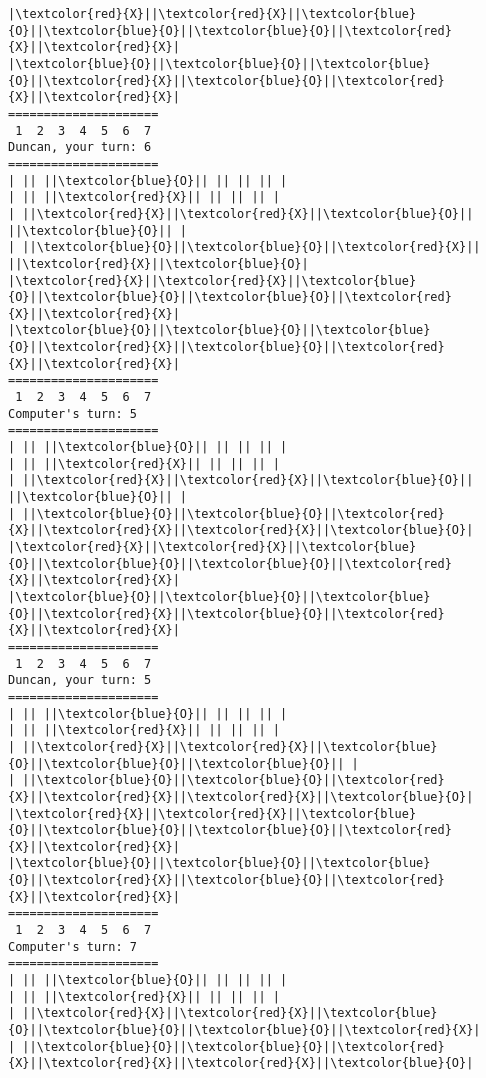 \documentclass{article}
\begin{document}
\begin{Verbatim}[commandchars=\\\{\}]
|\textcolor{red}{X}||\textcolor{red}{X}||\textcolor{blue}{O}||\textcolor{blue}{O}||\textcolor{blue}{O}||\textcolor{red}{X}||\textcolor{red}{X}|
|\textcolor{blue}{O}||\textcolor{blue}{O}||\textcolor{blue}{O}||\textcolor{red}{X}||\textcolor{blue}{O}||\textcolor{red}{X}||\textcolor{red}{X}|
=====================
 1  2  3  4  5  6  7
Duncan, your turn: 6
=====================
| || ||\textcolor{blue}{O}|| || || || |
| || ||\textcolor{red}{X}|| || || || |
| ||\textcolor{red}{X}||\textcolor{red}{X}||\textcolor{blue}{O}|| ||\textcolor{blue}{O}|| |
| ||\textcolor{blue}{O}||\textcolor{blue}{O}||\textcolor{red}{X}|| ||\textcolor{red}{X}||\textcolor{blue}{O}|
|\textcolor{red}{X}||\textcolor{red}{X}||\textcolor{blue}{O}||\textcolor{blue}{O}||\textcolor{blue}{O}||\textcolor{red}{X}||\textcolor{red}{X}|
|\textcolor{blue}{O}||\textcolor{blue}{O}||\textcolor{blue}{O}||\textcolor{red}{X}||\textcolor{blue}{O}||\textcolor{red}{X}||\textcolor{red}{X}|
=====================
 1  2  3  4  5  6  7
Computer's turn: 5
=====================
| || ||\textcolor{blue}{O}|| || || || |
| || ||\textcolor{red}{X}|| || || || |
| ||\textcolor{red}{X}||\textcolor{red}{X}||\textcolor{blue}{O}|| ||\textcolor{blue}{O}|| |
| ||\textcolor{blue}{O}||\textcolor{blue}{O}||\textcolor{red}{X}||\textcolor{red}{X}||\textcolor{red}{X}||\textcolor{blue}{O}|
|\textcolor{red}{X}||\textcolor{red}{X}||\textcolor{blue}{O}||\textcolor{blue}{O}||\textcolor{blue}{O}||\textcolor{red}{X}||\textcolor{red}{X}|
|\textcolor{blue}{O}||\textcolor{blue}{O}||\textcolor{blue}{O}||\textcolor{red}{X}||\textcolor{blue}{O}||\textcolor{red}{X}||\textcolor{red}{X}|
=====================
 1  2  3  4  5  6  7
Duncan, your turn: 5
=====================
| || ||\textcolor{blue}{O}|| || || || |
| || ||\textcolor{red}{X}|| || || || |
| ||\textcolor{red}{X}||\textcolor{red}{X}||\textcolor{blue}{O}||\textcolor{blue}{O}||\textcolor{blue}{O}|| |
| ||\textcolor{blue}{O}||\textcolor{blue}{O}||\textcolor{red}{X}||\textcolor{red}{X}||\textcolor{red}{X}||\textcolor{blue}{O}|
|\textcolor{red}{X}||\textcolor{red}{X}||\textcolor{blue}{O}||\textcolor{blue}{O}||\textcolor{blue}{O}||\textcolor{red}{X}||\textcolor{red}{X}|
|\textcolor{blue}{O}||\textcolor{blue}{O}||\textcolor{blue}{O}||\textcolor{red}{X}||\textcolor{blue}{O}||\textcolor{red}{X}||\textcolor{red}{X}|
=====================
 1  2  3  4  5  6  7
Computer's turn: 7
=====================
| || ||\textcolor{blue}{O}|| || || || |
| || ||\textcolor{red}{X}|| || || || |
| ||\textcolor{red}{X}||\textcolor{red}{X}||\textcolor{blue}{O}||\textcolor{blue}{O}||\textcolor{blue}{O}||\textcolor{red}{X}|
| ||\textcolor{blue}{O}||\textcolor{blue}{O}||\textcolor{red}{X}||\textcolor{red}{X}||\textcolor{red}{X}||\textcolor{blue}{O}|

\end{Verbatim}
\end{document}
